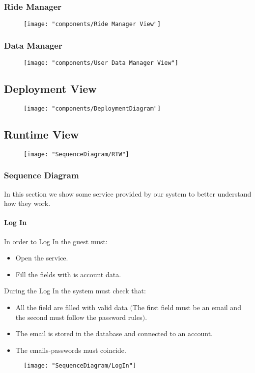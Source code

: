 	\subsubsection{Ride Manager}
		\begin{figure}[h!]
			\centering
			\texttt{[image: "components/Ride Manager View"]}
		\end{figure}

	\subsubsection{Data Manager}
		\begin{figure}[h!]
			\centering
			\texttt{[image: "components/User Data Manager View"]}
		\end{figure}



\subsection{Deployment View}
	\begin{figure}[h!]
			\centering
			\texttt{[image: "components/DeploymentDiagram"]}
	\end{figure}

\newpage

\subsection{Runtime View}
	\begin{figure}[h!]
			\centering
			\texttt{[image: "SequenceDiagram/RTW"]}
	\end{figure}
	\subsubsection{Sequence Diagram}
	In this section we show some service provided by our system to better understand how they work.
			\paragraph{Log In}
			In order to Log In the guest must: \begin{itemize}
				\item Open the service.
				\item Fill the fields with is account data.
			\end{itemize}
			During the Log In the system must check that:\begin{itemize}
				\item All the field are filled with valid data $($The first field must be an email and the second must follow the password rules$)$.
				\item The email is stored in the database and connected to an account.
				\item The emails-passwords must coincide.
			\end{itemize}
			\newpage
			\begin{figure}[h!]
				\centering
				\texttt{[image: "SequenceDiagram/LogIn"]}
			\end{figure}
			\newpage

